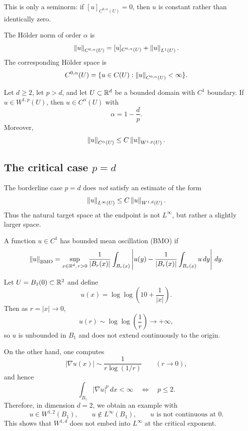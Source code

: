 \begin{remark}
This is only a seminorm: if $[u]_{C^{0,\alpha}(U)}=0$, then $u$ is constant rather than identically zero.
\end{remark}

\begin{definition}
The H\"older norm of order $\alpha$ is
\[
\left\lVert u \right\rVert_{C^{0,\alpha}(U)} = [u]_{C^{0,\alpha}(U)} + \left\lVert u \right\rVert_{L^1(U)}.
\]
The corresponding H\"older space is
\[
C^{0,\alpha}(U)=\{u\in C(U): \left\lVert u \right\rVert_{C^{0,\alpha}(U)}<\infty\}.
\]
\end{definition}

\begin{theorem}
Let $d\ge 2$, let $p>d$, and let $U\subset \mathbb{R}^d$ be a bounded domain with $C^1$ boundary. If $u\in W^{1,p}(U)$, then $u\in C^\alpha(U)$ with
\[
\alpha = 1-\frac{d}{p}.
\]
Moreover,
\[
\left\lVert u \right\rVert_{C^\alpha(U)} \le C\left\lVert u \right\rVert_{W^{1,p}(U)}.
\]
\end{theorem}

\subsection{The critical case $p=d$}

\begin{remark}
The borderline case $p=d$ does \emph{not} satisfy an estimate of the form
\[
\left\lVert u \right\rVert_{L^\infty(U)} \le C\left\lVert u \right\rVert_{W^{1,d}(U)}.
\]
Thus the natural target space at the endpoint is not $L^\infty$, but rather a slightly larger space.
\end{remark}

\begin{definition}
A function $u\in C^1$ has bounded mean oscillation (BMO) if
\[
\left\lVert u \right\rVert_{\mathrm{BMO}}
=
\sup_{x\in \mathbb{R}^d,\,r>0}
\frac{1}{|B_r(x)|}
\int_{B_r(x)}
\left|u(y)-\frac{1}{|B_r(x)|}\int_{B_r(x)}u\,dy\right|\,dy.
\]
\end{definition}

\begin{example}
Let $U=B_1(0)\subset \mathbb{R}^2$ and define
\[
u(x)=\log\log\left(10+\frac{1}{|x|}\right).
\]
Then as $r=|x|\to 0$,
\[
u(r) \sim \log\log\left(\frac{1}{r}\right) \to +\infty,
\]
so $u$ is unbounded in $B_1$ and does not extend continuously to the origin.

On the other hand, one computes
\[
|\nabla u(x)| \sim \frac{1}{r\log(1/r)}
\qquad (r\to 0),
\]
and hence
\[
\int_{B_1} |\nabla u|^p \, dx < \infty
\quad \Longleftrightarrow \quad p\le 2.
\]
Therefore, in dimension $d=2$, we obtain an example with
\[
u \in W^{1,2}(B_1),
\qquad u\notin L^\infty(B_1),
\qquad u \text{ is not continuous at }0.
\]
This shows that $W^{1,d}$ does not embed into $L^\infty$ at the critical exponent.
\end{example}

